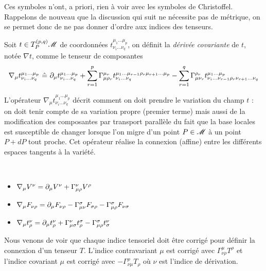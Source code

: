 \documentclass[a4paper,11pt]{report}
\begin{document}
                Ces symboles n'ont, a priori, rien à voir avec les symboles de Christoffel. Rappelons de nouveau que la discussion qui suit ne nécessite pas de métrique, on se permet donc de ne pas donner d'ordre aux indices des tenseurs.
                
                \begin{definition}
                    Soit $t\in T_P^{(p,q)}\mathscr{M}$ de coordonnées $t^{\mu_1\dots\mu_p}_{\nu_i\dots\nu_q}$, on définit la \textit{dérivée covariante} de $t$, notée $\nabla t$, comme le tenseur de composantes
                    \begin{equation}
                        \nabla_\mu t^{\mu_1\dots\mu_p}_{\nu_i\dots\nu_q} ~\hat{=}~ \partial_\mu t^{\mu_1\dots\mu_p}_{\nu_i\dots\nu_q}+\sum_{r=1}^p \Gamma^{\mu_r}_{\mu\rho_r}t^{\mu_1\dots\mu_{r-1}\rho_r\mu_{r+1}\dots\mu_p}_{\nu_i\dots\nu_q} - \sum_{r=1}^q \Gamma^{\rho_r}_{\mu\nu_r}t^{\mu_1\dots\mu_p}_{\nu_i\dots\nu_{r-1}\rho_r\nu_{r+1}\dots\nu_q}
                    \end{equation}
                \end{definition}
                
                L'opérateur $\nabla_\mu t^{\mu_1\dots\mu_p}_{\nu_i\dots\nu_q}$ décrit comment on doit prendre le variation du champ $t$ :  on doit tenir compte de sa variation propre (premier terme) mais aussi de la modification des composantes par transport parallèle du fait que la base locales est susceptible de changer lorsque l'on migre d'un point $P\in\mathscr{M}$ à un point $P+dP$ tout proche. Cet opérateur réalise la connexion (affine) entre les différents espaces tangents à la variété.
                
                \begin{exmp}${}$
                    \begin{itemize}[label = \textbullet]
                        \item $\nabla_\mu V^\nu = \partial_\mu V^\nu + \Gamma^\nu_{\mu\rho} V^\rho$
                        \item $\nabla_\mu F_{\nu\rho} = \partial_\mu F_{\nu\rho}-\Gamma^\sigma_{\mu\nu}F_{\sigma\rho}-\Gamma^{\sigma}_{\mu\rho}F_{\nu\sigma}$
                        \item $\nabla_\mu t^\nu_\rho = \partial_\mu t^\nu_\rho+\Gamma^\nu_{\mu\sigma}t^\sigma_\rho - \Gamma^\sigma_{\mu\rho}t^\nu_\sigma$
                    \end{itemize}
                    Nous venons de voir que chaque indice tensoriel doit être corrigé pour définir la connexion d'un tenseur $T$. L'indice contravariant $\mu$ est corrigé avec $\Gamma^\mu_{\nu\rho}T^\rho$ et l'indice covariant $\mu$ est corrigé avec $-\Gamma^\rho_{\nu\mu}T_\rho$ où $\nu$ est l'indice de dérivation.
                \end{exmp}
                
\end{document}
